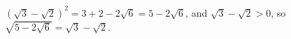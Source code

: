 $(\sqrt3-\sqrt2)^2=3+2-2\sqrt6=5-2\sqrt6$, and $\sqrt3-\sqrt2>0$, so $\sqrt{5-2\sqrt6}=\boxed{\sqrt3-\sqrt2}$.

